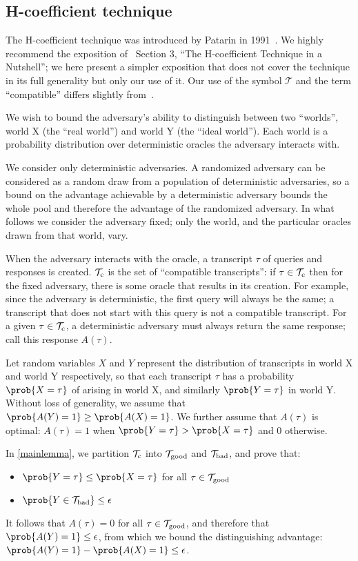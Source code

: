 \documentclass[hctr.tex]{subfiles}
\begin{document}
\subsection{H-coefficient technique}
The H-coefficient technique was introduced by Patarin in 1991~\cite{ppdes,hco}.
We highly recommend the exposition
of~\cite{hco2} Section 3,
``The H-coefficient Technique in a Nutshell'';
we here present a simpler exposition that
does not cover the technique in its full
generality but only our use of it.
Our use of the symbol \(\mathcal{T}\) and the term
``compatible'' differs slightly from~\cite{hco2}.

We wish to bound the adversary's ability to distinguish between
two ``worlds'', world X (the ``real world'') and world Y (the ``ideal world'').
Each world is a probability distribution over
deterministic oracles the adversary interacts with.

We consider only deterministic adversaries.
A randomized adversary can be considered as a random draw
from a population of deterministic adversaries, so
a bound on the advantage achievable by a deterministic
adversary bounds the whole pool and therefore
the advantage of the randomized adversary. In what follows
we consider the adversary fixed; only the world, and the
particular oracles drawn from that world, vary.

When the adversary interacts with the oracle,
a transcript \(\tau\) of queries and responses is created.
\(\mathcal{T}_\mathrm{c}\) is the set of ``compatible transcripts'':
if \(\tau \in \mathcal{T}_\mathrm{c}\) then for the fixed adversary,
there is some oracle
that results in its creation. For example,
since the adversary is deterministic, the first query
will always be the same; a transcript that
does not start with this query is not a compatible transcript.
For a given \(\tau \in \mathcal{T}_\mathrm{c}\),
a deterministic adversary must always
return the same response; call this response \(A(\tau)\).

Let random variables \(X\) and \(Y\)
represent the distribution of transcripts
in world X and world Y respectively, so that
each transcript \(\tau\) has a probability \(\prob{X = \tau}\)
of arising in world X, and similarly \(\prob{Y = \tau}\) in world Y.
Without loss of generality,
we assume that \(\prob{A(Y) = 1} \geq \prob{A(X) = 1}\).
We further assume that \(A(\tau)\) is optimal:
\(A(\tau) = 1\)
when \(\prob{Y = \tau} > \prob{X = \tau}\) and 0 otherwise.

In \autoref{mainlemma}, we partition \(\mathcal{T}_\mathrm{c}\) into \(\mathcal{T}_\mathrm{good}\) and \(\mathcal{T}_\mathrm{bad}\),
and prove that:
\begin{itemize}
    \item \(\prob{Y = \tau} \leq \prob{X = \tau}\) for all \(\tau \in \mathcal{T}_\mathrm{good}\)
    \item \(\prob{Y \in \Tb} \leq \epsilon\)
\end{itemize}
It follows that \(A(\tau) = 0\) for all \(\tau \in \mathcal{T}_\mathrm{good}\),
and therefore that \(\prob{A(Y) = 1} \leq \epsilon\),
from which we bound the distinguishing advantage:
\(\prob{A(Y) = 1} - \prob{A(X) = 1} \leq \epsilon\).
\end{document}
